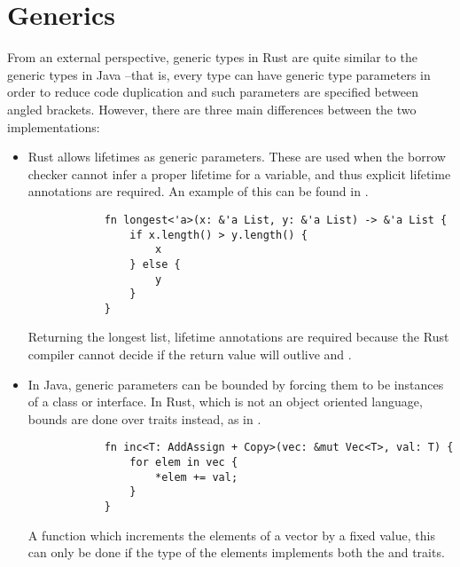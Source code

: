 \section{Generics}

From an external perspective, generic types in Rust are quite similar to the
generic types in Java --that is, every type can have generic type parameters in
order to reduce code duplication and such parameters are specified between
angled brackets. However, there are three main differences between the two
implementations:

\begin{itemize}
    \item Rust allows lifetimes as generic parameters. These are used when the
        borrow checker cannot infer a proper lifetime for a variable, and thus
        explicit lifetime annotations are required. An example of this can be
        found in .
  
        \begin{listing}[ht]
            \begin{verbatim}
            fn longest<'a>(x: &'a List, y: &'a List) -> &'a List {
                if x.length() > y.length() {
                    x
                } else {
                    y
                }
            }
            \end{verbatim}
            \caption{Returning the longest list, lifetime annotations are required
            because the Rust compiler cannot decide if the return value will outlive
         and .}
          \label{lst:gen_lifetimes}
        \end{listing}
    
    \item In Java, generic parameters can be bounded by forcing them to be
        instances of a class or interface. In Rust, which is not an object
        oriented language, bounds are done over traits instead, as in
        .
  
        \begin{listing}[ht]
            \begin{verbatim}
            fn inc<T: AddAssign + Copy>(vec: &mut Vec<T>, val: T) {
                for elem in vec {
                    *elem += val;
                }
            }
            \end{verbatim}
            \caption{A function which increments the elements of a vector by a fixed
                value, this can only be done if the type of the elements 
                implements both the  and  traits.}
          \label{lst:bounds}
        \end{listing}


\end{itemize}
